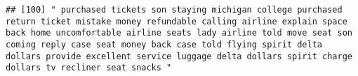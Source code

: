 \documentclass[
]{article}
\begin{document}
\begin{verbatim}
## [100] " purchased tickets son staying michigan college purchased return ticket mistake money refundable calling airline explain space back home uncomfortable airline seats lady airline told move seat son coming reply case seat money back case told flying spirit delta dollars provide excellent service luggage delta dollars spirit charge dollars tv recliner seat snacks "                                                                                                                                                                                                                                                                                                                                                                                                                                                                                                                                                                                                                                                                                                                                                                                                                                                                                                                                                                                                                                                                                                                                                                                                                                                                                                                                                                                                                   

\end{verbatim}
\end{document}
